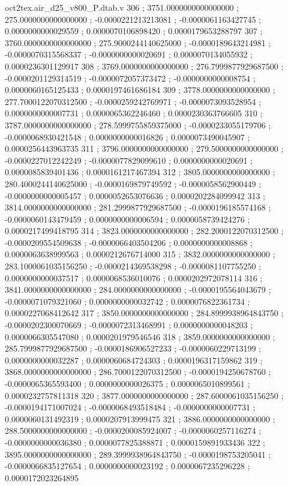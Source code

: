 \begin{filecontents}[overwrite]{oct2tex.air_d25_v800_P.dtab.v}
306 ; 3751.0000000000000000 ; 275.0000000000000000 ; -0.0000221213213081 ; -0.0000061163427745 ; 0.0000000000029559 ; 0.0000070106898420 ; 0.0000179653288797
307 ; 3760.0000000000000000 ; 275.9000244140625000 ; -0.0000189643214981 ; -0.0000070315568337 ; -0.0000000000020691 ; 0.0000070134055932 ; 0.0000236301129917
308 ; 3769.0000000000000000 ; 276.7999877929687500 ; -0.0000201129314519 ; -0.0000072057373472 ; -0.0000000000008754 ; 0.0000060165125433 ; 0.0000197461686184
309 ; 3778.0000000000000000 ; 277.7000122070312500 ; -0.0000259242769971 ; -0.0000073093528954 ; 0.0000000000007731 ; 0.0000065362246460 ; 0.0000230363766605
310 ; 3787.0000000000000000 ; 278.5999755859375000 ; -0.0000233055179706 ; -0.0000068930421548 ; 0.0000000000016826 ; 0.0000073490045907 ; 0.0000256443963735
311 ; 3796.0000000000000000 ; 279.5000000000000000 ; -0.0000227012242249 ; -0.0000077829099610 ; 0.0000000000020691 ; 0.0000085839401436 ; 0.0000161217467394
312 ; 3805.0000000000000000 ; 280.4000244140625000 ; -0.0000169879749592 ; -0.0000058562900449 ; -0.0000000000005457 ; 0.0000052653076636 ; 0.0000202284099942
313 ; 3814.0000000000000000 ; 281.2999877929687500 ; -0.0000196185574168 ; -0.0000060143479459 ; 0.0000000000006594 ; 0.0000058739424276 ; 0.0000217499418795
314 ; 3823.0000000000000000 ; 282.2000122070312500 ; -0.0000209554509638 ; -0.0000066403504206 ; 0.0000000000008868 ; 0.0000063638999563 ; 0.0000212676714000
315 ; 3832.0000000000000000 ; 283.1000061035156250 ; -0.0000214369538298 ; -0.0000081107755250 ; 0.0000000000037517 ; 0.0000068536010076 ; 0.0000202972078114
316 ; 3841.0000000000000000 ; 284.0000000000000000 ; -0.0000195564043679 ; -0.0000071079321060 ; 0.0000000000032742 ; 0.0000076822361734 ; 0.0000227068412642
317 ; 3850.0000000000000000 ; 284.8999938964843750 ; -0.0000202300070669 ; -0.0000072313468991 ; 0.0000000000048203 ; 0.0000066305547080 ; 0.0000201979546546
318 ; 3859.0000000000000000 ; 285.7999877929687500 ; -0.0000186906527233 ; -0.0000060229713199 ; 0.0000000000032287 ; 0.0000060684724303 ; 0.0000196317159862
319 ; 3868.0000000000000000 ; 286.7000122070312500 ; -0.0000194250678760 ; -0.0000065365593400 ; 0.0000000000026375 ; 0.0000065010899561 ; 0.0000232757811318
320 ; 3877.0000000000000000 ; 287.6000061035156250 ; -0.0000194171007024 ; -0.0000068493518484 ; -0.0000000000007731 ; 0.0000060131492319 ; 0.0000207913999475
321 ; 3886.0000000000000000 ; 288.5000000000000000 ; -0.0000200085924007 ; -0.0000060257116274 ; -0.0000000000036380 ; 0.0000077825388871 ; 0.0000159891933436
322 ; 3895.0000000000000000 ; 289.3999938964843750 ; -0.0000198753205041 ; -0.0000066835127654 ; 0.0000000000023192 ; 0.0000067235296228 ; 0.0000172023264895

\end{filecontents}
